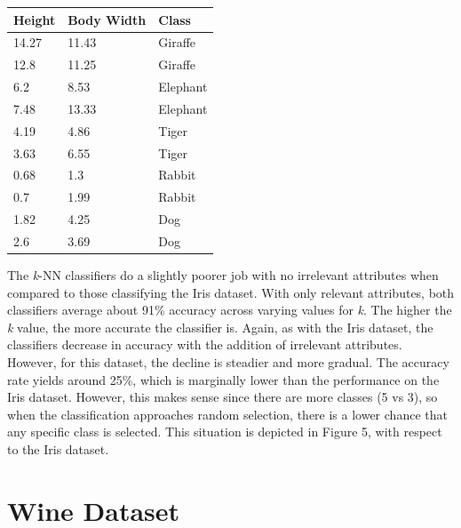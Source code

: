 \documentclass{article}
\begin{document}
\begin{center}
\begin{tabular}{ | l | l | l | }
\hline
\textbf{Height} & \textbf{Body Width} & \textbf{Class} \\ 
\hline
\hline
14.27 & 11.43 & Giraffe \\ \hline
12.8 & 11.25 & Giraffe \\ \hline
6.2 & 8.53 & Elephant \\ \hline
7.48 & 13.33 & Elephant \\ \hline
4.19 & 4.86 & Tiger \\ \hline
3.63 & 6.55 & Tiger \\ \hline
0.68 & 1.3 & Rabbit \\ \hline 
0.7 & 1.99 & Rabbit \\ \hline
1.82 & 4.25 & Dog \\ \hline
2.6 & 3.69 & Dog \\ \hline

\end{tabular}
\end{center}

The \textit{k}-NN classifiers do a slightly poorer job with no irrelevant attributes when compared to those classifying the Iris dataset. With only relevant attributes, both classifiers average about 91\% accuracy across varying values for \textit{k}. The higher the \textit{k} value, the more accurate the classifier is. Again, as with the Iris dataset, the classifiers decrease in accuracy with the addition of irrelevant attributes. However, for this dataset, the decline is steadier and more gradual. The accuracy rate yields around 25\%, which is marginally lower than the performance on the Iris dataset. However, this makes sense since there are more classes (5 vs 3), so when the classification approaches random selection, there is a lower chance that any specific class is selected. This situation is depicted in Figure 5, with respect to the Iris dataset.  

\section{Wine Dataset}
\end{document}
